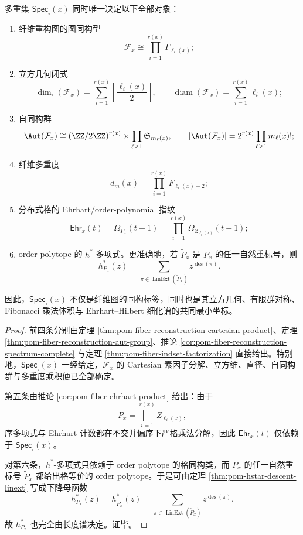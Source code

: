 \begin{theorem}\label{thm:conclusion-fiber-spectrum-common-coordinate-geometry-ehrhart-replay}
多重集 \(\mathsf{Spec}_{\square}(x)\) 同时唯一决定以下全部对象：
\begin{enumerate}
  \item 纤维重构图的图同构型
  \[
  \mathcal F_x\cong \prod_{i=1}^{r(x)}\Gamma_{\ell_i(x)};
  \]
  \item 立方几何闭式
  \[
  \dim_{\square}(\mathcal F_x)=\sum_{i=1}^{r(x)}\left\lceil\frac{\ell_i(x)}{2}\right\rceil,
  \qquad
  \operatorname{diam}(\mathcal F_x)=\sum_{i=1}^{r(x)}\ell_i(x);
  \]
  \item 自同构群
  \[
  \Aut(\mathcal F_x)\cong
  (\ZZ/2\ZZ)^{r(x)}\rtimes \prod_{\ell\ge 1}\mathfrak S_{m_\ell(x)},
  \qquad
  |\Aut(\mathcal F_x)|=2^{r(x)}\prod_{\ell\ge 1}m_\ell(x)!;
  \]
  \item 纤维多重度
  \[
  d_m(x)=\prod_{i=1}^{r(x)}F_{\ell_i(x)+2};
  \]
  \item 分布式格的 Ehrhart/order-polynomial 指纹
  \[
  \mathsf{Ehr}_x(t)=\Omega_{P_x}(t+1)
  =\prod_{i=1}^{r(x)}\Omega_{Z_{\ell_i(x)}}(t+1);
  \]
  \item order polytope 的 \(h^\ast\)-多项式。更准确地，若 \(\widetilde P_x\) 是 \(P_x\) 的任一自然重标号，则
  \[
  h_{P_x}^\ast(z)=\sum_{\pi\in \operatorname{LinExt}(\widetilde P_x)} z^{\operatorname{des}(\pi)}.
  \]
\end{enumerate}
因此，\(\mathsf{Spec}_{\square}(x)\) 不仅是纤维图的同构标签，同时也是其立方几何、有限群对称、Fibonacci 乘法体积与 Ehrhart--Hilbert 细化谱的共同最小坐标。
\end{theorem}
\begin{proof}
前四条分别由定理 \ref{thm:pom-fiber-reconstruction-cartesian-product}、定理 \ref{thm:pom-fiber-reconstruction-aut-group}、推论 \ref{cor:pom-fiber-reconstruction-spectrum-complete} 与定理 \ref{thm:pom-fiber-indset-factorization} 直接给出。特别地，\(\mathsf{Spec}_{\square}(x)\) 一经给定，\(\mathcal F_x\) 的 Cartesian 素因子分解、立方维、直径、自同构群与多重度乘积便已全部确定。

第五条由推论 \ref{cor:pom-fiber-ehrhart-product} 给出：由于
\[
P_x=\bigsqcup_{i=1}^{r(x)} Z_{\ell_i(x)},
\]
序多项式与 Ehrhart 计数都在不交并偏序下严格乘法分解，因此 \(\mathsf{Ehr}_x(t)\) 仅依赖于 \(\mathsf{Spec}_{\square}(x)\)。

对第六条，\(h^\ast\)-多项式只依赖于 order polytope 的格同构类，而 \(P_x\) 的任一自然重标号 \(\widetilde P_x\) 都给出格等价的 order polytope。于是可由定理 \ref{thm:pom-hstar-descent-linext} 写成下降母函数
\[
h_{P_x}^\ast(z)=h_{\widetilde P_x}^\ast(z)
=
\sum_{\pi\in \operatorname{LinExt}(\widetilde P_x)} z^{\operatorname{des}(\pi)}.
\]
故 \(h_{P_x}^\ast\) 也完全由长度谱决定。证毕。
\end{proof}

